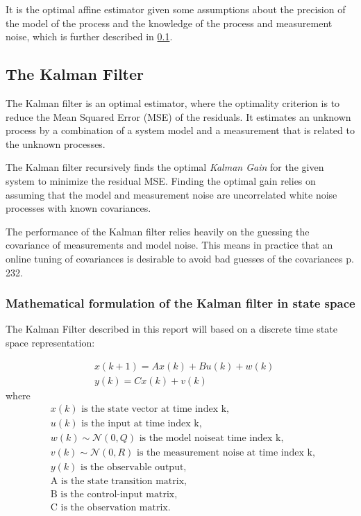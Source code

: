 It is the optimal affine estimator given some assumptions about the precision of the model of the process and the knowledge of the process and measurement noise, which is further described in \cref{sec:the_kalman_filter}.





\subsection{The Kalman Filter} \label{sec:the_kalman_filter}
The Kalman filter is an optimal estimator, where the optimality criterion is to reduce the Mean Squared Error (MSE) of the residuals.
It estimates an unknown process by a combination of a system model and a measurement that is related to the unknown processes. 

The Kalman filter recursively finds the optimal \textit{Kalman Gain} for the given system to minimize the residual MSE. Finding the optimal gain relies on assuming that the model and measurement noise are uncorrelated white noise processes with known covariances. 

The performance of the Kalman filter relies heavily on the guessing the covariance of measurements and model noise. This means in practice that an online tuning of covariances is desirable to avoid bad guesses of the covariances \cite{Doraiswami2014} p. 232.

\subsubsection{Mathematical formulation of the Kalman filter in state space}
The Kalman Filter described in this report will based on a discrete time state space representation: 

\begin{align}
	&{x}(k+1) = {A}{x}(k) + {B}{u}(k) + {w}(k)  \label{eq:KalmanSystemEquations} \\
	&{y}(k) = {C}{x}(k)+{v}(k) 
\end{align}
where 
\begin{align*}
	&\text{${x}(k)$ is the state vector at time index k,					}	\\[-1em]
	&\text{${u}(k)$ is the input at time index k, 						}	\\[-1em]
	&\text{${w}(k) \sim \mathcal{N}(0, Q)$ is the model noiseat time index k,			}	\\[-1em]
	&\text{${v}(k) \sim \mathcal{N}(0, R)$ is the measurement noise at time index k,		}	\\[-1em]
	&\text{${y}(k)$ is the observable output, 							}	\\[-1em]
	&\text{{A} is the state transition matrix,							}	\\[-1em]
	&\text{{B} is the control-input matrix,								}	\\[-1em]
	&\text{{C} is the observation matrix. 								}	\\[-1em]
\end{align*}

